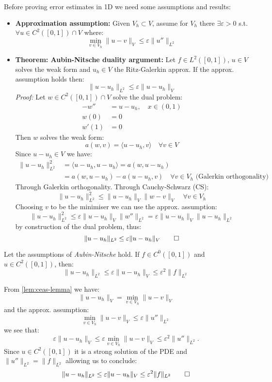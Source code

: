 Before proving error estimates in 1D we need some assumptions and results:
\begin{itemize}
    \item \textbf{Approximation assumption:} Given $V_h \subset V$, assume for $V_h$ there $\exists \varepsilon > 0$ s.t. $\forall u \in C^2([0, 1]) \cap V$ where:
          \[
              \min_{v \in V_h} \|u - v\|_V \leq \varepsilon \|u''\|_{L^2}
          \]
    \item \textbf{Theorem: Aubin-Nitsche duality argument:}
          Let $f \in L^2([0, 1])$, $u \in V$ solves the weak form and $u_h \in V$ the Ritz-Galerkin approx. If the approx. assumption holds then:
          \[\|u - u_h\|_{L^2} \leq \varepsilon \|u - u_h\|_V\]
          \emph{Proof:}
          Let $w \in C^2([0, 1]) \cap V$ solve the dual problem:
          \begin{align*}
              -w''  & = u - u_h, \quad x \in (0, 1) \\
              w(0)  & = 0                           \\
              w'(1) & = 0
          \end{align*}
          Then $w$ solves the weak form:
          \[a(w, v) = \langle u - u_h, v \rangle \quad \forall v \in V\]
          Since $u - u_h \in V$ we have:
          \begin{align*}
              \|u - u_h\|_{L^2}^2 & = \langle u - u_h, u - u_h \rangle = a(w, u - u_h)                                       \\
                                  & = a(w, u - u_h) - a(u - u_h, v) \quad \forall v \in V_h \text{ (Galerkin orthogonality)}
          \end{align*}
          Through Galerkin orthogonality. Through Cauchy-Schwarz (CS):
          \[
              \|u - u_h\|_{L^2}^2 \leq \|u - u_h\|_V \|w - v\|_V \quad \forall v \in V_h
          \]
          Choosing $v$ to be the minimiser we can use the approx. assumption:
          \[
              \|u - u_h\|_{L^2}^2 \leq \varepsilon \|u - u_h\|_V \|w''\|_{L^2} = \varepsilon \|u - u_h\|_V \|u - u_h\|_{L^2}
          \]
          by construction of the dual problem, thus:
          \[
              \|u - u_h\|_{L^2} \leq \varepsilon \|u - u_h\|_V \qed
          \]
\end{itemize}

\begin{corollary}{}{}
    Let the assumptions of \emph{Aubin-Nitsche} hold. If $f \in C^0([0, 1])$ and $u \in C^2([0, 1])$, then:
    \[
        \|u - u_h\|_{L^2} \leq \varepsilon \|u - u_h\|_V \leq \varepsilon^2 \|f\|_{L^2}
    \]
\end{corollary}
From \ref{lem:ceas-lemma} we have:
\[\|u - u_h\|_V = \min_{v \in V_h} \|u - v\|_V\]
and the approx. assumption:
\[\min_{v \in V_h} \|u - v\|_V \leq \varepsilon \|u''\|_{L^2}\]
we see that:
\[\varepsilon \|u - u_h\|_V \leq \varepsilon \min_{v \in V_h} \|u - v\|_V \leq \varepsilon^2 \|u''\|_{L^2}.\]
Since $u \in C^2([0, 1])$ it is a strong solution of the PDE and $\|u''\|_{L^2} = \|f\|_{L^2}$ allowing us to conclude:
\[\|u - u_h\|_{L^2} \leq \varepsilon \|u - u_h\|_V \leq \varepsilon^2 \|f\|_{L^2} \qed\]

